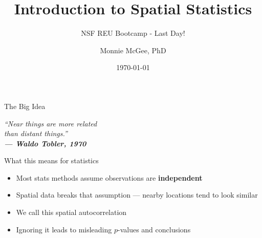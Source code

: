 \documentclass[aspectratio=169, 12pt]{beamer}
\title[Spatial Statistics]{Introduction to Spatial Statistics}
\subtitle{NSF REU Bootcamp - Last Day!}
\author{Monnie McGee, PhD}
\institute{Southern Methodist Universtiy}
\date{\today}
\begin{document}

\begin{frame}
  \titlepage
\end{frame}

\begin{frame}{The Big Idea}
  \begin{center}
    \Large\itshape
    ``Near things are more related\\
    than distant things.''\\[0.6em]
    \normalsize\upshape\textbf{--- Waldo Tobler, 1970}
  \end{center}
  \vspace{0.8em}
  \begin{block}{What this means for statistics}
    \begin{itemize}
      \item Most stats methods assume observations are \textbf{independent}
      \item Spatial data breaks that assumption --- nearby locations tend to look similar
      \item We call this \alert{spatial autocorrelation}
      \item Ignoring it leads to misleading $p$-values and conclusions
    \end{itemize}
  \end{block}
\end{frame}

\end{document}

